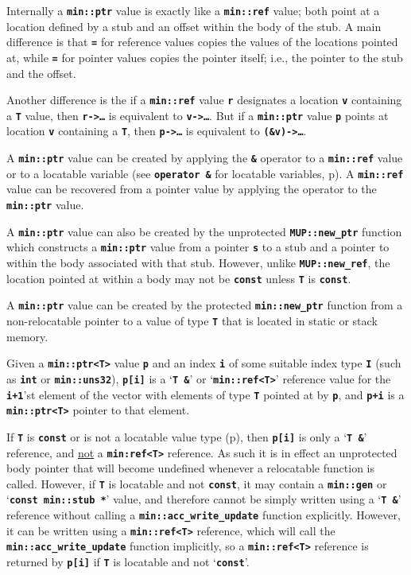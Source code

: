 \documentclass[12pt]{article}
\newcommand{\TT}[1]{{\tt \bfseries #1}}
\newcommand{\pagref}[1]{p\pageref{#1}}
\newcommand{\EOL}{\penalty \exhyphenpenalty}
\begin{document}
Internally a \TT{min::\EOL ptr\TARG} value is exactly like a
\TT{min::\EOL ref\TARG} value; both point at a location defined by
a stub and an offset within the body of the stub.
A main difference is that \TT{=} for reference values copies the
values of the locations pointed at, while \TT{=} for pointer values
copies the pointer itself; i.e., the pointer to the stub and the offset.

Another difference is the if a \TT{min::\EOL ref\TARG} value \TT{r}
designates a location \TT{v} containing a \TT{T} value, then
\TT{r->\ldots} is equivalent to \TT{v->\ldots}.
But if a \TT{min::\EOL ptr\TARG} value \TT{p}
points at location \TT{v} containing a \TT{T}, then
\TT{p->\ldots} is equivalent to \TT{(\&v)->\ldots}.

A \TT{min::\EOL ptr\TARG} value can be created by applying the
\TT{\&} operator to a \TT{min::\EOL ref\TARG} value or to a
locatable variable (see \TT{operator \&} for locatable variables,
\pagref{LOCATABLE_VAR_PTR}).
A \TT{min::\EOL ref\TARG} value can be recovered from a
pointer value by applying the
\TT{*} operator to the \TT{min::\EOL ptr\TARG} value.

A \TT{min::\EOL ptr\TARG} value can also be created by the
unprotected \TT{MUP::\EOL new\_\EOL ptr} function which
constructs a \TT{min::\EOL ptr\TARG} value
from a pointer \TT{s} to a stub and a pointer to
within the body associated with that stub.
However, unlike \TT{MUP::\EOL new\_\EOL ref},
the location pointed at within a body may not be \TT{const} unless \TT{T} is
\TT{const}.

A \TT{min::\EOL ptr\TARG} value can be created by the
protected \TT{min::\EOL new\_\EOL ptr} function from
a non-relocatable pointer to a value of type \TT{T} that is located
in static or stack memory.

Given a \TT{min::\EOL ptr<T>} value \TT{p} and an index \TT{i} of some
suitable index type \TT{I} (such as \TT{int} or \TT{min::\EOL uns32}),
\TT{p[i]} is a `\TT{T \&}' or `\TT{min::\EOL ref<T>}'
reference value for the \TT{i+1}'st element of
the vector with elements of type \TT{T} pointed at by \TT{p}, and
\TT{p+i} is a \TT{min::\EOL ptr<T>} pointer to that element.

If \TT{T} is \TT{const} or is not a locatable value type
(\pagref{LOCATABLE-VALUE}), then
\TT{p[i]} is only a `\TT{T \&}' reference, and
\underline{not} a \TT{min:\EOL ref<T>} reference.  As such it is
in effect an unprotected body pointer that will become undefined whenever
a relocatable function is called.
However, if \TT{T} is locatable and not \TT{const},
it may contain a \TT{min::gen} or `\TT{const min::\EOL stub *}' value,
and therefore cannot be simply written using a
`\TT{T \&}' reference
without calling a \TT{min::\EOL acc\_\EOL write\_\EOL update} function
explicitly.
However, it can be written using a
\TT{min::\EOL ref<T>} reference,
which will call the \TT{min::\EOL acc\_\EOL write\_\EOL update} function
implicitly,
so a \TT{min::\EOL ref<T>} reference is returned by \TT{p[i]} if
\TT{T} is locatable and not `\TT{const}'.
\end{document}
